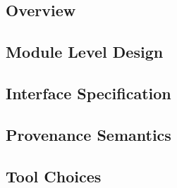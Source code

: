\documentclass[10pt]{scrartcl}
\begin{document}
\subsection{Overview}


\subsection{Module Level Design}


\subsection{Interface Specification}


\subsection{Provenance Semantics}


\subsection{Tool Choices}

\end{document}
